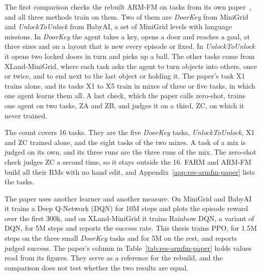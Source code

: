 \documentclass[11pt,english,listoffigures,listoftables]{tfgetsinf}
\newcommand{\env}[1]{\textsf{\slshape #1}}  %
\begin{document}
The first comparison checks the rebuilt ARM-FM on tasks from its own paper~\cite{creus2026armfm}, and all three methods train on them. Two of them are \env{DoorKey} from MiniGrid and \env{UnlockToUnlock} from BabyAI, a set of MiniGrid levels with language missions.
In \env{DoorKey} the agent takes a key, opens a door and reaches a goal, at three sizes and on a layout that is new every episode or fixed. In \env{UnlockToUnlock} it opens two locked doors in turn and picks up a ball. The other tasks come from XLand-MiniGrid, where each task asks the agent to turn objects into others, once or twice, and to end next to the last object or holding it. The paper's task X1 trains alone, and its tasks X1 to X5 train in mixes of three or five tasks, in which one agent learns them all. A last check, which the paper calls zero-shot, trains one agent on two tasks, ZA and ZB, and judges it on a third, ZC, on which it never trained.

The count covers 16 tasks. They are the five \env{DoorKey} tasks, \env{UnlockToUnlock}, X1 and ZC trained alone, and the eight tasks of the two mixes. A task of a mix is judged on its own, and its three runs are the three runs of the mix. The zero-shot check judges ZC a second time, so it stays outside the 16. FARM and ARM-FM build all their RMs with no hand edit, and Appendix~\ref{app:res-armfm-paper} lists the tasks.

The paper uses another learner and another measure. On MiniGrid and BabyAI it trains a Deep Q-Network (DQN) for 10M steps and plots the episode reward over the first 300k, and on XLand-MiniGrid it trains Rainbow DQN, a variant of DQN, for 5M steps and reports the success rate. This thesis trains PPO, for 1.5M steps on the three small \env{DoorKey} tasks and for 5M on the rest, and reports judged success. The paper's column in Table~\ref{tab:res-armfm-paper} holds values read from its figures. They serve as a reference for the rebuild, and the comparison does not test whether the two results are equal.
\end{document}
